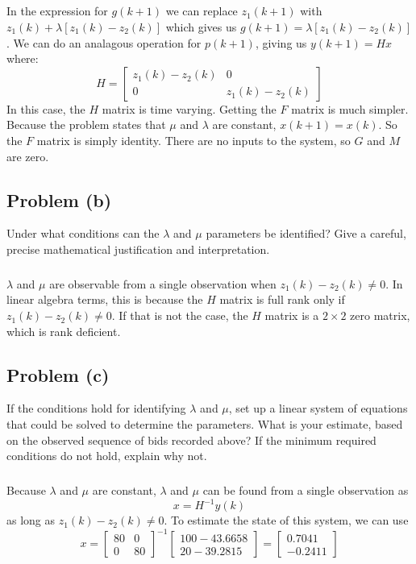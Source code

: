 \documentclass[11pt]{article}
\begin{document}
\subparagraph*{}
In the expression for $g(k+1)$ we can replace $z_1(k+1)$ with $z_1(k)+\lambda[z_1(k)-z_2(k)]$ which gives us $g(k+1) = \lambda[z_1(k)-z_2(k)]$. We can do an analagous operation for $p(k+1)$, giving us $y(k+1) = Hx$ where:
\begin{equation*}
	H=\begin{bmatrix} z_1(k)-z_2(k) & 0 \\ 0 & z_1(k)-z_2(k) \end{bmatrix}
\end{equation*}
In this case, the $H$ matrix is time varying. Getting the $F$ matrix is much simpler. Because the problem states that $\mu$ and $\lambda$ are constant, $x(k+1) = x(k)$. So the $F$ matrix is simply identity. There are no inputs to the system, so $G$ and $M$ are zero.

\subsection*{Problem (b)}
Under what conditions can the $\lambda$ and $\mu$ parameters be identified? Give a careful, precise mathematical justification and interpretation.

\subparagraph*{}
$\lambda$ and $\mu$ are observable from a single observation when $z_1(k) - z_2(k)\neq0$. In linear algebra terms, this is because the $H$ matrix is full rank only if $z_1(k)-z_2(k)\neq0$. If that is not the case, the $H$ matrix is a $2\times2$ zero matrix, which is rank deficient.  

\subsection*{Problem (c)}
If the conditions hold for identifying $\lambda$ and $\mu$, set up a linear system of equations that could be solved to determine the parameters. What is your estimate, based on the observed sequence of bids recorded above? If the minimum required conditions do not hold, explain why not.

\subparagraph*{}
Because $\lambda$ and $\mu$ are constant, $\lambda$ and $\mu$ can be found from a single observation as
\begin{equation*}
	x=H^{-1}y(k)
\end{equation*}
as long as $z_1(k)-z_2(k)\neq0$. To estimate the state of this system, we can use
\begin{equation*}
	x = \begin{bmatrix} 80 & 0 \\ 0 & 80 \end{bmatrix}^{-1} \begin{bmatrix} 100-43.6658 \\ 20-39.2815\end{bmatrix} = \begin{bmatrix} 0.7041 \\ -0.2411 \end{bmatrix}
\end{equation*}
\end{document}
